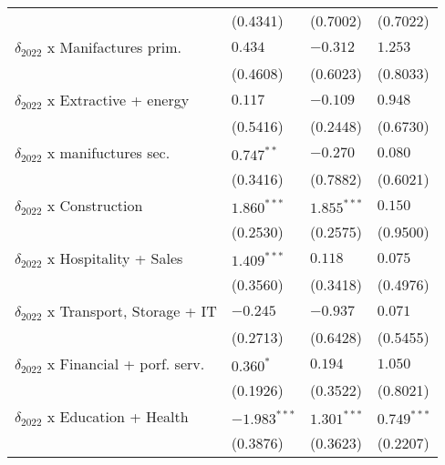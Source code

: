\begin{tabular}{llll}
                                                   &           (0.4341) &           (0.7002) &           (0.7022) \\
$\delta_{2022}$ x Manifactures prim.               &            $0.434$ &           $-0.312$ &            $1.253$ \\
                                                   &           (0.4608) &           (0.6023) &           (0.8033) \\
$\delta_{2022}$ x Extractive + energy              &            $0.117$ &           $-0.109$ &            $0.948$ \\
                                                   &           (0.5416) &           (0.2448) &           (0.6730) \\
$\delta_{2022}$ x manifuctures sec.                &       $0.747^{**}$ &           $-0.270$ &            $0.080$ \\
                                                   &           (0.3416) &           (0.7882) &           (0.6021) \\
$\delta_{2022}$ x Construction                     &      $1.860^{***}$ &      $1.855^{***}$ &            $0.150$ \\
                                                   &           (0.2530) &           (0.2575) &           (0.9500) \\
$\delta_{2022}$ x Hospitality + Sales              &      $1.409^{***}$ &            $0.118$ &            $0.075$ \\
                                                   &           (0.3560) &           (0.3418) &           (0.4976) \\
$\delta_{2022}$ x Transport, Storage + IT          &           $-0.245$ &           $-0.937$ &            $0.071$ \\
                                                   &           (0.2713) &           (0.6428) &           (0.5455) \\
$\delta_{2022}$ x Financial + porf. serv.          &          $0.360^*$ &            $0.194$ &            $1.050$ \\
                                                   &           (0.1926) &           (0.3522) &           (0.8021) \\
$\delta_{2022}$ x Education + Health               &     $-1.983^{***}$ &      $1.301^{***}$ &      $0.749^{***}$ \\
                                                   &           (0.3876) &           (0.3623) &           (0.2207) \\

\end{tabular}
